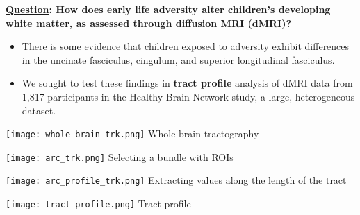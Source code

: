 \documentclass[a0paper,landscape,fontscale=0.385]{baposter}
\newenvironment{Figure}
  {\par\medskip\noindent\minipage{\linewidth}}
  {\endminipage\par\medskip}
\begin{document}
\begin{poster}
{\vspace{0.5em}
\noindent\textbf{%
    \underline{Question}: %
    How does early life adversity alter children's developing white matter, as
    assessed through diffusion MRI (dMRI)?
}
\vspace{0.5em}

\begin{itemize}[nosep, leftmargin=*]
    \item There is some evidence that children exposed to adversity exhibit
    differences in the uncinate fasciculus, cingulum, and superior longitudinal
    fasciculus\cite{gur2019burden}. 
    \item We sought to test these findings in \textbf{tract profile} analysis of
    dMRI data from 1,817 participants in the Healthy Brain Network
    study\cite{richiehalford2022analysis}, a large, heterogeneous dataset.
\end{itemize}

\vspace{-1em}
\begin{multicols}{4}
    \begin{Figure}
        \centering
        \texttt{[image: whole\_brain\_trk.png]}
        Whole brain tractography
    \end{Figure}
    \columnbreak
    \begin{Figure}
        \centering
        \texttt{[image: arc\_trk.png]}
        Selecting a bundle with ROIs
    \end{Figure}

    \columnbreak
    \begin{Figure}
        \centering
        \texttt{[image: arc\_profile\_trk.png]}
        Extracting values along the length of the tract
    \end{Figure}
    \columnbreak
    \begin{Figure}
        \vspace{0.25cm}
        \centering
        \texttt{[image: tract\_profile.png]}
        Tract profile
    \end{Figure}

    \vspace{2em}
\end{multicols}
\vspace{-0.5em}
}


\end{poster}
\end{document}
